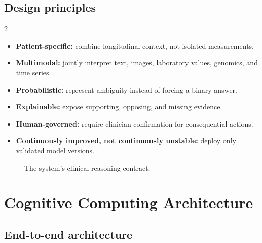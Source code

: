 \documentclass[11pt,a4paper]{article}
\begin{document}
\subsection{Design principles}
\begin{multicols}{2}
\begin{itemize}
  \item \textbf{Patient-specific:} combine longitudinal context, not isolated measurements.
  \item \textbf{Multimodal:} jointly interpret text, images, laboratory values, genomics, and time series.
  \item \textbf{Probabilistic:} represent ambiguity instead of forcing a binary answer.
  \item \textbf{Explainable:} expose supporting, opposing, and missing evidence.
  \item \textbf{Human-governed:} require clinician confirmation for consequential actions.
  \item \textbf{Continuously improved, not continuously unstable:} deploy only validated model versions.
\end{itemize}
\end{multicols}

\begin{figure}[H]
\centering
{}
\caption{The system's clinical reasoning contract.}
\end{figure}

\section{Cognitive Computing Architecture}

\subsection{End-to-end architecture}
\end{document}
